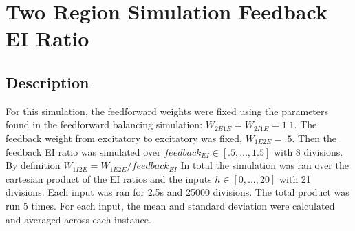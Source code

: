 \documentclass[10pt]{article}
\begin{document}
\section{Two Region Simulation Feedback EI Ratio}
\subsection{Description}
For this simulation, the feedforward weights were fixed using the parameters found in the feedforward balancing simulation: $W_{2E1E} = W_{2I1E} = 1.1$. The feedback weight from excitatory to excitatory was fixed, $W_{1E2E} = .5$. Then the feedback EI ratio was simulated over $feedback_{EI} \in [.5,...,1.5]$ with 8 divisions. By definition $W_{1I2E} = W_{1E2E}/feedback_{EI}$ In total the simulation was ran over the cartesian product of the EI ratios and the inputs $h \in [0,...,20]$ with 21 divisions. Each input was ran for 2.5s and 25000 divisions. The total product was run 5 times. For each input, the mean and standard deviation were calculated and averaged across each instance. 
\end{document}
